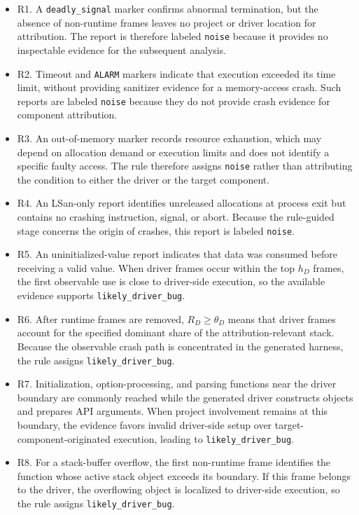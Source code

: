 \documentclass[pdflatex,sn-basic]{sn-jnl}%
\theoremstyle{thmstyleone}%
\theoremstyle{thmstyletwo}%
\theoremstyle{thmstylethree}%
\begin{document}
\begin{itemize}
    \item R1. A \texttt{deadly\_signal} marker confirms abnormal termination, but the absence of non-runtime frames leaves no project or driver location for attribution. The report is therefore labeled \texttt{noise} because it provides no inspectable evidence for the subsequent analysis.
    \item R2. Timeout and \texttt{ALARM} markers indicate that execution exceeded its time limit, without providing sanitizer evidence for a memory-access crash. Such reports are labeled \texttt{noise} because they do not provide crash evidence for component attribution.
    \item R3. An out-of-memory marker records resource exhaustion, which may depend on allocation demand or execution limits and does not identify a specific faulty access. The rule therefore assigns \texttt{noise} rather than attributing the condition to either the driver or the target component.
    \item R4. An LSan-only report identifies unreleased allocations at process exit but contains no crashing instruction, signal, or abort. Because the rule-guided stage concerns the origin of crashes, this report is labeled \texttt{noise}.
    \item R5. An uninitialized-value report indicates that data was consumed before receiving a valid value. When driver frames occur within the top \(h_D\) frames, the first observable use is close to driver-side execution, so the available evidence supports \texttt{likely\_driver\_bug}.
    \item R6. After runtime frames are removed, \(R_D\ge \theta_D\) means that driver frames account for the specified dominant share of the attribution-relevant stack. Because the observable crash path is concentrated in the generated harness, the rule assigns \texttt{likely\_driver\_bug}.
    \item R7. Initialization, option-processing, and parsing functions near the driver boundary are commonly reached while the generated driver constructs objects and prepares API arguments. When project involvement remains at this boundary, the evidence favors invalid driver-side setup over target-component-originated execution, leading to \texttt{likely\_driver\_bug}.
    \item R8. For a stack-buffer overflow, the first non-runtime frame identifies the function whose active stack object exceeds its boundary. If this frame belongs to the driver, the overflowing object is localized to driver-side execution, so the rule assigns \texttt{likely\_driver\_bug}.

\end{itemize}
\end{document}
